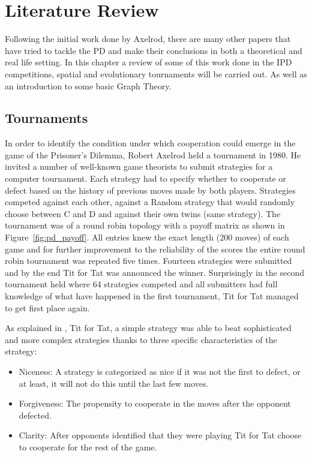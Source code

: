 \chapter{Literature Review}
\label{chap:Two}

Following the initial work done by Axelrod, there are many other papers that
have tried to tackle the PD and make their conclusions in both a
theoretical and real life setting. In this chapter a review of some of this work
done in the IPD competitions, spatial and evolutionary tournaments will be carried out.
As well as an introduction to some basic Graph Theory.

\section{Tournaments}

In order to identify the condition under which cooperation could emerge
in the game of the Prisoner's Dilemma, Robert Axelrod held a tournament
in 1980. He invited a number of well-known game theorists to submit strategies
for a computer tournament. Each strategy had to specify whether to cooperate or
defect based on the history of previous moves made by both players.
Strategies competed against each other, against a Random strategy that would
randomly choose between C and D and against their own twins (same strategy).
The tournament was of a round robin topology
with a payoff matrix as shown in Figure~\ref{fig:pd_payoff}. All entries knew the
exact length (200 moves) of each game and for further improvement to the reliability of the scores
the entire round robin tournament was repeated five times. Fourteen strategies were
submitted and by the end Tit for Tat was announced the winner. Surprisingly in
the second tournament held where 64 strategies competed and all submitters had
full knowledge of what have happened in the first tournament, Tit for Tat
managed to get first place again\cite{Axelrod1980a}.

As explained in \cite{Axelrod1980b}, Tit for Tat, a simple strategy was
able to beat sophisticated and more complex strategies thanks to three
specific characteristics of the strategy:

\begin{itemize}
  \item Niceness:  A strategy is categorized as nice if it was not the
                    first to defect, or at least, it will not do this until
                    the last few moves.
  \item Forgiveness: The propensity to cooperate in the moves after the
                     opponent defected.
  \item Clarity: After opponents identified that they were playing Tit for Tat
                 choose to cooperate for the rest of the game.
\end{itemize}

